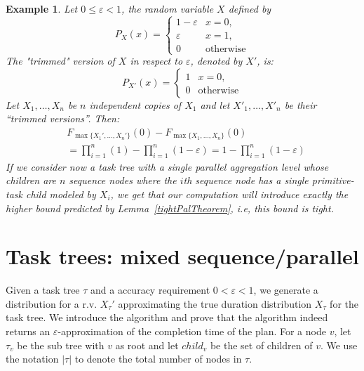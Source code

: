 \documentclass{article}
\newtheorem{example}{Example}
\begin{document}
\begin{example}\label{expl:parallel}
Let $0 {\leq} \varepsilon {<}1$, 
the random variable $X$ defined by
$$
P_{X}(x) =\begin{cases}
1-\varepsilon  & x=0, \\
\varepsilon     & x=1, \\
0 & \text{otherwise}
\end{cases}
$$
The "trimmed" version of $X$ in respect to $\varepsilon$, denoted by $X'$, is:
$$
P_{X'}(x) =\begin{cases}
1  & x=0, \\
0 & \text{otherwise}
\end{cases}
$$
Let $X_1, \dots, X_n$ be $n$ independent copies of $X_1$ and let $X'_1, \dots, X'_n$ be their ``trimmed versions''. Then:
{\small
\begin{align*} 
&F_{\max\{X_1',\dots, X_n'\}}( 0) - F_{\max\{X_1,\dots, X_n\}} (0)\\
&=\prod_{i=1}^n (1)-\prod_{i=1}^n (1-\varepsilon)= 1-\prod_{i=1}^n (1-\varepsilon)
\end{align*}}
If we consider now a task tree with a single parallel aggregation level whose children are $n$ 
sequence nodes where the $i$th sequence node has a single primitive-task child modeled by $X_i$, we get that our
computation will introduce exactly the higher bound predicted by Lemma~\ref{tightPalTheorem}, i.e, this bound is tight.
\end{example}

\section{Task trees: mixed sequence/parallel}

Given a task tree $\tau$ and a accuracy requirement $0<\varepsilon<1$, we generate a distribution for a r.v. $X_{\tau}' $
approximating the true duration distribution  $X_{\tau}$ for the task tree. 
We introduce the algorithm and prove that the algorithm indeed returns an $\varepsilon$-approximation of the completion time of the plan. 
For a node $v$, let $\tau_v $ be the sub tree with $v$ as root and let $child_v$ be the set of children of $v$. 
We use the notation $|\tau|$ to denote the total number of nodes in $\tau$.
\end{document}
